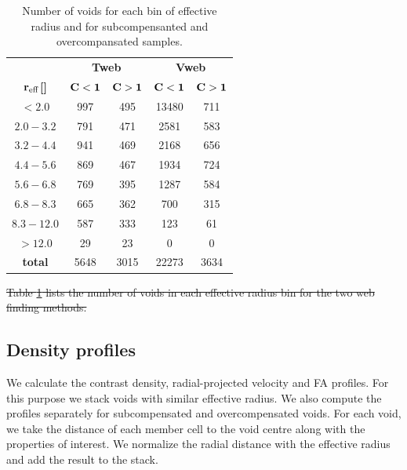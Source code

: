 \documentclass[a4,useAMS,usenatbib,usegraphicx]{mn2e}
\newcommand{\hMpc}{{\ifmmode{h^{-1}{\rm Mpc}}\else{$h^{-1}$Mpc}\fi}}
\newcommand{\reff}{{\ifmmode{r_{\mbox{\tiny eff}}}\else{$r_{\mbox{\tiny eff}}$}\fi}}
\providecommand{\DIFaddtex}[1]{{\protect\color{blue}\uwave{#1}}} %
\providecommand{\DIFdeltex}[1]{{\protect\color{red}\sout{#1}}}                      %
\providecommand{\DIFdelbegin}{} %
\providecommand{\DIFdelend}{} %
\providecommand{\DIFaddFL}[1]{\DIFadd{#1}} %
\providecommand{\DIFdelFL}[1]{\DIFdel{#1}} %
\providecommand{\DIFaddbeginFL}{} %
\providecommand{\DIFaddendFL}{} %
\providecommand{\DIFdelbeginFL}{} %
\providecommand{\DIFdelendFL}{} %
\providecommand{\DIFadd}[1]{\texorpdfstring{\DIFaddtex{#1}}{#1}} %
\providecommand{\DIFdel}[1]{\texorpdfstring{\DIFdeltex{#1}}{}} %
\begin{document}
\begin{table}[!htbp]
\centering
\begin{tabular}{c | c c | c c}
\toprule
\multicolumn{1}{c}{}&  \multicolumn{2}{c}{\textbf{Tweb}} & \multicolumn{2}{c}{\textbf{Vweb}}\\
\textbf{\DIFdelbeginFL \DIFdelFL{${\bf r_{\rm eff}}$}\DIFdelendFL \DIFaddbeginFL \DIFaddFL{${\bf \reff }$}\DIFaddendFL [\hMpc]}   & $\bf{C<1}$   & $\bf{C>1}$    & $\bf{C<1}$   & $\bf{C>1}$\\ \hline
$<2.0$        &  997 & 495   & 13480  & 711\\
$2.0-3.2$     &  791 & 471   & 2581   & 583\\
$3.2-4.4$     &  941 & 469   & 2168   & 656\\
$4.4-5.6$     &  869 & 467   & 1934   & 724\\
$5.6-6.8$     &  769 & 395   & 1287   & 584\\
$6.8-8.3$     &  665 & 362   & 700    & 315\\
$8.3-12.0$    &  587 & 333   & 123    & 61\\
$>12.0$       &  29  & 23    & 0      & 0\\ \hline
\textbf{total}& 5648 & 3015  & 22273  & 3634\\
\bottomrule
\end{tabular}
\caption{Number of voids for each bin of effective radius and for 
subcompensanted and overcompansated samples.}
\label{tab:number_voids}
\end{table}



\DIFdelbegin \DIFdel{Table \ref{tab:number_voids} lists the number of voids in 
each effective radius bin for the two web finding methods.
}%

\DIFdelend %
\subsection{Density profiles}
\label{subsec:density_voids}


We calculate the contrast density, radial-projected velocity and 
FA profiles. 
For this purpose we stack voids with similar effective radius.
We also compute the profiles separately  for subcompensated and
overcompensated voids. 
For each void,  
we take the distance of each member cell to the void centre along with the 
properties of interest. 
We normalize the radial distance with the effective radius and add the
result to the stack.
\end{document}
